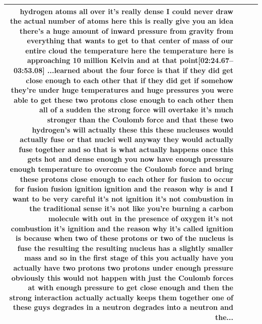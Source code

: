 \documentclass[10pt]{article}
\begin{document}
\begin{tiny}
\begin{longtable}{|r|p{0.375in}|p{1.275in}|p{3.5in}|}
hydrogen atoms all over it's really dense I could never draw the actual number of atoms here this is really give you an idea there's a huge amount of inward pressure from gravity from everything that wants to get to that center of mass of our entire cloud the temperature here the temperature here is approaching 10 million Kelvin and at that point\newline\textbf{[02:24.67--03:53.08]} ...learned about the four force is that if they did get close enough to each other that if they did get if somehow they're under huge temperatures and huge pressures you were able to get these two protons close enough to each other then all of a sudden the strong force will overtake it's much stronger than the Coulomb force and that these two hydrogen's will actually these this these nucleuses would actually fuse or that nuclei well anyway they would actually fuse together and so that is what actually happens once this gets hot and dense enough you now have enough pressure enough temperature to overcome the Coulomb force and bring these protons close enough to each other for fusion to occur for fusion fusion ignition ignition and the reason why is and I want to be very careful it's not ignition it's not combustion in the traditional sense it's not like you're burning a carbon molecule with out in the presence of oxygen it's not combustion it's ignition and the reason why it's called ignition is because when two of these protons or two of the nucleus is fuse the resulting the resulting nucleus has a slightly smaller mass and so in the first stage of this you actually have you actually have two protons two protons under enough pressure obviously this would not happen with just the Coulomb forces at with enough pressure to get close enough and then the strong interaction actually actually keeps them together one of these guys degrades in a neutron degrades into a neutron and the... \\\hline

\end{longtable}
\end{tiny}
\end{document}

